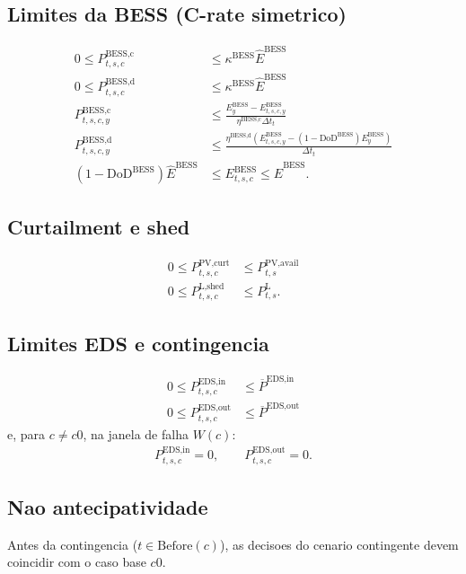 \documentclass[11pt,a4paper]{article}
\begin{document}
\subsection*{Limites da BESS (C-rate simetrico)}
\begin{align}
0 \le P_{t,s,c}^{\text{BESS,c}} &\le \kappa^{\text{BESS}}\hat{E}^{\text{BESS}}\\
0 \le P_{t,s,c}^{\text{BESS,d}} &\le \kappa^{\text{BESS}}\hat{E}^{\text{BESS}}\\
P_{t,s,c,y}^{\text{BESS,c}}
&\le \frac{E_y^{\text{BESS}}-E_{t,s,c,y}^{\text{BESS}}}
{\eta^{\text{BESS,c}}\Delta t_t}\\
P_{t,s,c,y}^{\text{BESS,d}}
&\le \frac{\eta^{\text{BESS,d}}
\left(E_{t,s,c,y}^{\text{BESS}}-(1-\text{DoD}^{\text{BESS}})
E_y^{\text{BESS}}\right)}{\Delta t_t}\\
(1-\text{DoD}^{\text{BESS}})\hat{E}^{\text{BESS}} &\le E_{t,s,c}^{\text{BESS}} \le \hat{E}^{\text{BESS}}.
\end{align}

\subsection*{Curtailment e shed}
\begin{align}
0 \le P_{t,s,c}^{\text{PV,curt}} &\le P_{t,s}^{\text{PV,avail}}\\
0 \le P_{t,s,c}^{\text{L,shed}} &\le P_{t,s}^{\text{L}}.
\end{align}

\subsection*{Limites EDS e contingencia}
\begin{align}
0 \le P_{t,s,c}^{\text{EDS,in}} &\le \overline{P}^{\text{EDS,in}}\\
0 \le P_{t,s,c}^{\text{EDS,out}} &\le \overline{P}^{\text{EDS,out}}
\end{align}
e, para \(c \neq c0\), na janela de falha \(W(c)\):
\begin{align}
P_{t,s,c}^{\text{EDS,in}} = 0,\qquad
P_{t,s,c}^{\text{EDS,out}} = 0.
\end{align}

\subsection*{Nao antecipatividade}
Antes da contingencia (\(t \in \text{Before}(c)\)), as decisoes do cenario
contingente devem coincidir com o caso base \(c0\).
\end{document}

